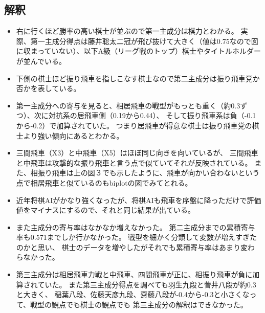 \documentclass[11pt,a4paper,dvipdfmx]{jsarticle}
\begin{document}
\subsection{解釈}
\begin{itemize}
    \item 右に行くほど勝率の高い棋士が並ぶので第一主成分は棋力とわかる。
    実際、第一主成分得点は藤井聡太二冠が飛び抜けて大きく（値は0.75なので図に収まっていない）、以下A級（リーグ戦のトップ）棋士やタイトルホルダーが並んでいる。
    \item 下側の棋士ほど振り飛車を指しこなす棋士なので第二主成分は振り飛車党か否かを表している。
    \item 第一主成分への寄与を見ると、相居飛車の戦型がもっとも重く（約0.3ずつ）、次に対抗系の居飛車側（0.19から0.44）、
    そして振り飛車系は負（-0.1から-0.2）で加算されていた。
    つまり居飛車が得意な棋士は振り飛車党の棋士より強い傾向にあるとわかる。
    \item 三間飛車（X3）と中飛車（X5）はほぼ同じ向きを向いているが、
    三間飛車と中飛車は攻撃的な振り飛車と言う点で似ていてそれが反映されている。
    また、相振り飛車は上の図３でも示したように、飛車が向かい合わないという点で相居飛車と似ているのもbiplotの図でみてとれる。
    \item 近年将棋AIがかなり強くなったが、将棋AIも飛車を序盤に降っただけで評価値をマイナスにするので、それと同じ結果が出ている。
    \item また主成分の寄与率はなかなか増えなかった。
    第二主成分までの累積寄与率も0.571までしか行かなかった。
    戦型を細かく分類して変数が増えすぎたのかと思い、
    棋士のデータを増やしたがそれでも累積寄与率はあまり変わらなかった。
    \item 第三主成分は相居飛車力戦と中飛車、四間飛車が正に、相振り飛車が負に加算されていた。
    また第三主成分得点を調べても羽生九段と菅井八段が約0.3と大きく、
    稲葉八段、佐藤天彦九段、齋藤八段が-0.4から-0.3と小さくなって、戦型の観点でも棋士の観点でも
    第三主成分の解釈はできなかった。

\end{itemize}
\end{document}
